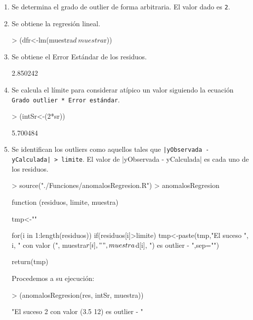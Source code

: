\documentclass [a4paper] {article}
\begin{document}
\begin{enumerate}
\item Se determina el grado de outlier de forma arbitraria. El valor dado es \texttt{2}.
\item Se obtiene la regresión lineal.
\begin{Schunk}
\begin{Sinput}
> (dfr<-lm(muestra$d~muestra$r))
\end{Sinput}
\end{Schunk}
\item Se obtiene el Error Estándar de los residuos.
\begin{Schunk}
\begin{Soutput}
[1] 2.850242
\end{Soutput}
\end{Schunk}
\item Se calcula el límite para considerar atípico un valor siguiendo la ecuación 
\texttt{Grado outlier * Error estándar}.
\begin{Schunk}
\begin{Sinput}
> (intSr<-(2*sr))
\end{Sinput}
\begin{Soutput}
[1] 5.700484
\end{Soutput}
\end{Schunk}
\item Se identifican los outliers como aquellos tales que \texttt{|yObservada - yCalculada| > limite}.
El valor de |yObservada - yCalculada| es cada uno de los residuos.
\begin{Schunk}
\begin{Sinput}
> source("./Funciones/anomalosRegresion.R")
> anomalosRegresion
\end{Sinput}
\begin{Soutput}
function (residuos, limite, muestra) {
    tmp<-""

    for(i in 1:length(residuos)){
        if(residuos[i]>limite){
            tmp<-paste(tmp,"El suceso ", i, 
                " con valor (", muestra$r[i]," ",
                 muestra$d[i], ") es outlier - ",sep="")
        }
    }

    return(tmp)
}
\end{Soutput}
\end{Schunk}
\bigskip
Procedemos a su ejecución:
\begin{Schunk}
\begin{Sinput}
> (anomalosRegresion(res, intSr, muestra))
\end{Sinput}
\begin{Soutput}
[1] "El suceso 2 con valor (3.5 12) es outlier - "
\end{Soutput}
\end{Schunk}
\end{enumerate}
\end{document}
